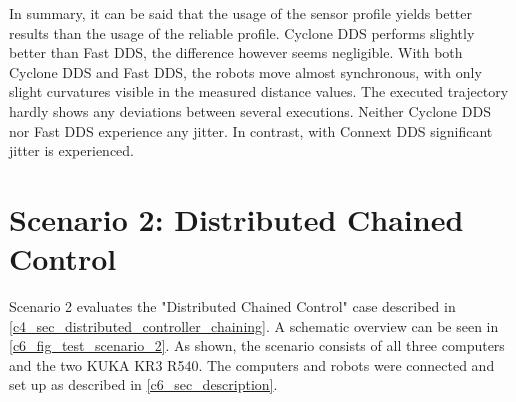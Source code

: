 In summary, it can be said that the usage of the sensor profile yields better results than the usage of the reliable profile. Cyclone DDS performs slightly better than Fast DDS, the difference however seems negligible. With both Cyclone DDS and Fast DDS, the robots move almost synchronous, with only slight curvatures visible in the measured distance values. The executed trajectory hardly shows any deviations between several executions. Neither Cyclone DDS nor Fast DDS experience any jitter. In contrast, with Connext DDS significant jitter is experienced.


\section{Scenario 2: Distributed Chained Control}
Scenario 2 evaluates the "Distributed Chained Control" case described in \autoref{c4_sec_distributed_controller_chaining}. A schematic overview can be seen in \autoref{c6_fig_test_scenario_2}. As shown, the scenario consists of all three computers and the two KUKA KR3 R540. The computers and robots were connected and set up as described in \autoref{c6_sec_description}.

